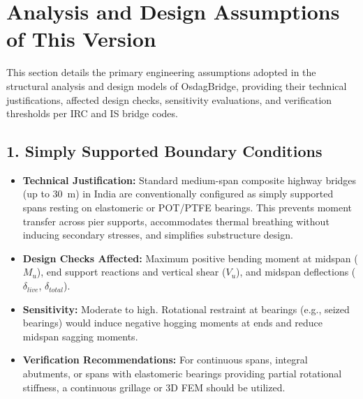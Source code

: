 \documentclass[12pt,a4paper]{report}
\numberwithin{table}{chapter}
\numberwithin{figure}{chapter}
\begin{document}
\clearpage
\section{Analysis and Design Assumptions of This Version}
\label{sec:assumptions}

This section details the primary engineering assumptions adopted in the structural analysis and design models of OsdagBridge, providing their technical justifications, affected design checks, sensitivity evaluations, and verification thresholds per IRC and IS bridge codes.

\subsection{1. Simply Supported Boundary Conditions}
\begin{itemize}
    \item \textbf{Technical Justification:} Standard medium-span composite highway bridges (up to 30~m) in India are conventionally configured as simply supported spans resting on elastomeric or POT/PTFE bearings. This prevents moment transfer across pier supports, accommodates thermal breathing without inducing secondary stresses, and simplifies substructure design.
    \item \textbf{Design Checks Affected:} Maximum positive bending moment at midspan ($M_u$), end support reactions and vertical shear ($V_u$), and midspan deflections ($\delta_{live}$, $\delta_{total}$).
    \item \textbf{Sensitivity:} Moderate to high. Rotational restraint at bearings (e.g., seized bearings) would induce negative hogging moments at ends and reduce midspan sagging moments.
    \item \textbf{Verification Recommendations:} For continuous spans, integral abutments, or spans with elastomeric bearings providing partial rotational stiffness, a continuous grillage or 3D FEM should be utilized.
\end{itemize}
\end{document}

